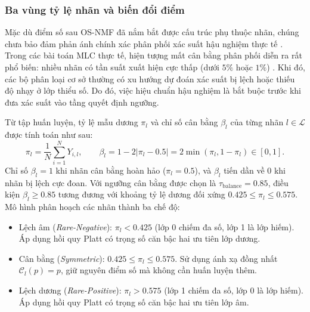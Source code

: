 \documentclass[11pt,a4paper]{article}
\begin{document}
\subsubsection{Ba vùng tỷ lệ nhãn và biến đổi điểm}
Mặc dù điểm số sau OS-NMF đã nắm bắt được cấu trúc phụ thuộc nhãn, chúng chưa bảo đảm phản ánh chính xác phân phối xác suất hậu nghiệm thực tế \cite{cal2023,xmlcal2025}. Trong các bài toán MLC thực tế, hiện tượng mất cân bằng phân phối diễn ra rất phổ biến: nhiều nhãn có tần suất xuất hiện cực thấp (dưới \(5\%\) hoặc \(1\%\)) \cite{imb2021}. Khi đó, các bộ phân loại cơ sở thường có xu hướng dự đoán xác suất bị lệch hoặc thiếu độ nhạy ở lớp thiểu số. Do đó, việc hiệu chuẩn hậu nghiệm là bắt buộc trước khi đưa xác suất vào tầng quyết định ngưỡng.

Từ tập huấn luyện, tỷ lệ mẫu dương \(\pi_l\) và chỉ số cân bằng \(\beta_l\) của từng nhãn \(l \in \mathcal L\) được tính toán như sau:
\begin{equation}
\pi_l = \frac{1}{N}\sum_{i=1}^{N}Y_{i,l}, \qquad \beta_l = 1 - 2|\pi_l - 0.5| = 2\min(\pi_l, 1-\pi_l) \in [0, 1].
\label{eq:balance-index}
\end{equation}
Chỉ số \(\beta_l = 1\) khi nhãn cân bằng hoàn hảo (\(\pi_l = 0.5\)), và \(\beta_l\) tiến dần về 0 khi nhãn bị lệch cực đoan. Với ngưỡng cân bằng được chọn là \(\tau_{\mathrm{balance}} = 0.85\), điều kiện \(\beta_l \ge 0.85\) tương đương với khoảng tỷ lệ dương đối xứng \(0.425 \le \pi_l \le 0.575\). Mô hình phân hoạch các nhãn thành ba chế độ:
\begin{itemize}
  \item Lệch âm (\emph{Rare-Negative}): \(\pi_l < 0.425\) (lớp 0 chiếm đa số, lớp 1 là lớp hiếm). Áp dụng hồi quy Platt có trọng số căn bậc hai ưu tiên lớp dương.
  \item Cân bằng (\emph{Symmetric}): \(0.425 \le \pi_l \le 0.575\). Sử dụng ánh xạ đồng nhất \(\mathcal C_l(p) = p\), giữ nguyên điểm số mà không cần huấn luyện thêm.
  \item Lệch dương (\emph{Rare-Positive}): \(\pi_l > 0.575\) (lớp 1 chiếm đa số, lớp 0 là lớp hiếm). Áp dụng hồi quy Platt có trọng số căn bậc hai ưu tiên lớp âm.
\end{itemize}
\end{document}
